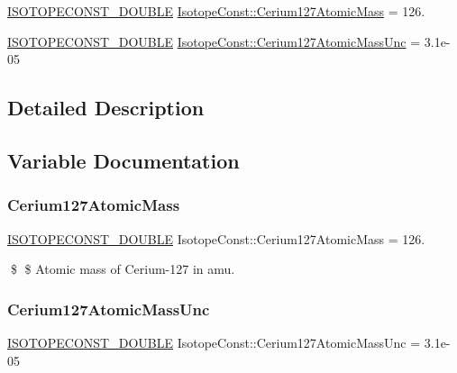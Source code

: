 \begin{DoxyCompactItemize}
\item 
\mbox{\hyperlink{group___isotope_const-_macros_ga8f45a7272ce02c0b4c65c44636ed719a}{I\+S\+O\+T\+O\+P\+E\+C\+O\+N\+S\+T\+\_\+\+D\+O\+U\+B\+LE}} \mbox{\hyperlink{group___isotope_const-_cerium-_ce127_ga39f81b8d4cba0573853cf622fb5d96b1}{Isotope\+Const\+::\+Cerium127\+Atomic\+Mass}} = 126.
\item 
\mbox{\hyperlink{group___isotope_const-_macros_ga8f45a7272ce02c0b4c65c44636ed719a}{I\+S\+O\+T\+O\+P\+E\+C\+O\+N\+S\+T\+\_\+\+D\+O\+U\+B\+LE}} \mbox{\hyperlink{group___isotope_const-_cerium-_ce127_gae5ed76016eca4ac518dfb903e53d4301}{Isotope\+Const\+::\+Cerium127\+Atomic\+Mass\+Unc}} = 3.\+1e-\/05
\end{DoxyCompactItemize}


\subsection{Detailed Description}


\subsection{Variable Documentation}
\mbox{\label{group___isotope_const-_cerium-_ce127_ga39f81b8d4cba0573853cf622fb5d96b1}} 
\subsubsection{\texorpdfstring{Cerium127\+Atomic\+Mass}{Cerium127AtomicMass}}
{\footnotesize\ttfamily \mbox{\hyperlink{group___isotope_const-_macros_ga8f45a7272ce02c0b4c65c44636ed719a}{I\+S\+O\+T\+O\+P\+E\+C\+O\+N\+S\+T\+\_\+\+D\+O\+U\+B\+LE}} Isotope\+Const\+::\+Cerium127\+Atomic\+Mass = 126.}

\$ \$ Atomic mass of Cerium-\/127 in amu. \mbox{\label{group___isotope_const-_cerium-_ce127_gae5ed76016eca4ac518dfb903e53d4301}} 
\subsubsection{\texorpdfstring{Cerium127\+Atomic\+Mass\+Unc}{Cerium127AtomicMassUnc}}
{\footnotesize\ttfamily \mbox{\hyperlink{group___isotope_const-_macros_ga8f45a7272ce02c0b4c65c44636ed719a}{I\+S\+O\+T\+O\+P\+E\+C\+O\+N\+S\+T\+\_\+\+D\+O\+U\+B\+LE}} Isotope\+Const\+::\+Cerium127\+Atomic\+Mass\+Unc = 3.\+1e-\/05}


